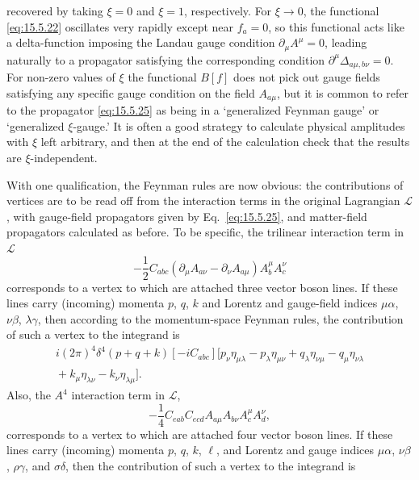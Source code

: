 recovered by taking $\xi=0$ and $\xi=1$, respectively. For $\xi\to0$, the
functional \eqref{eq:15.5.22} oscillates very rapidly except near $f_a=0$,
so this functional acts like a delta-function imposing the Landau gauge
condition $\partial_\mu A^\mu=0$, leading naturally to a propagator satisfying
the corresponding condition $\partial^\mu\Delta_{a\mu,b\nu}=0$. For
non-zero values of $\xi$ the functional $B[f]$ does not pick out gauge fields
satisfying any specific gauge condition on the field $A_{a\mu}$, but it is
common to refer to the propagator \eqref{eq:15.5.25} as being in a `generalized
Feynman gauge' or `generalized $\xi$-gauge.' It is often a good strategy to
calculate physical amplitudes with $\xi$ left arbitrary, and then at the end of
the calculation check that the results are $\xi$-independent.

With one qualification, the Feynman rules are now obvious: the contributions
of vertices are to be read off from the interaction terms in the original
Lagrangian $\mathcal L$, with gauge-field propagators given by
Eq.~\eqref{eq:15.5.25}, and matter-field propagators calculated as before. To
be specific, the trilinear interaction term in $\mathcal L$
\begin{equation*}
  -\frac12C_{abc}
  (\partial_\mu A_{a\nu}-\partial_\nu A_{a\mu})
  A_b^\mu A_c^\nu
\end{equation*}
corresponds to a vertex to which are attached three vector boson lines. If
these lines carry (incoming) momenta $p$, $q$, $k$ and Lorentz and gauge-field
indices $\mu\alpha$, $\nu\beta$, $\lambda\gamma$, then according to the
momentum-space Feynman rules, the contribution of such a vertex to the
integrand is
\begin{multline}
  i(2\pi)^4\delta^4(p+q+k)[-iC_{abc}]
  \bigl[p_\nu\eta_{\mu\lambda}-p_\lambda\eta_{\mu\nu}
  +q_\lambda\eta_{\nu\mu}-q_\mu\eta_{\nu\lambda}\\
  {}+k_\mu\eta_{\lambda\nu}-k_\nu\eta_{\lambda\mu}\bigr].
  \tag{15.5.26}\label{eq:15.5.26}
\end{multline}
Also, the $A^4$ interaction term in $\mathcal L$,
\begin{equation*}
  -\frac14C_{eab}C_{ecd}
  A_{a\mu}A_{b\nu}A_c^\mu A_d^\nu,
\end{equation*}
corresponds to a vertex to which are attached four vector boson lines. If these
lines carry (incoming) momenta $p$, $q$, $k$, $\ell$, and Lorentz and gauge
indices $\mu\alpha$, $\nu\beta$, $\rho\gamma$, and $\sigma\delta$, then the
contribution of such a vertex to the integrand is
